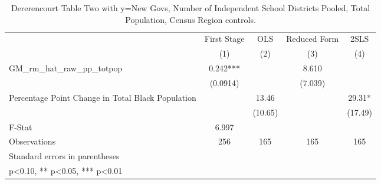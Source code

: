 \begin{table}[htbp]\centering
\def\sym#1{\ifmmode^{#1}\else\(^{#1}\)\fi}
\caption{Dererencourt Table Two with y=New Govs, Number of Independent School Districts  Pooled, Total Population, Census Region controls.}
\begin{tabular}{l*{4}{c}}
\toprule
                    & First Stage   &         OLS   &Reduced Form   &        2SLS   \\
                    &\multicolumn{1}{c}{(1)}   &\multicolumn{1}{c}{(2)}   &\multicolumn{1}{c}{(3)}   &\multicolumn{1}{c}{(4)}   \\
\midrule
GM\_rm\_hat\_raw\_pp\_totpop&       0.242***&               &       8.610   &               \\
                    &    (0.0914)   &               &     (7.039)   &               \\
\addlinespace
Percentage Point Change in Total Black Population&               &       13.46   &               &       29.31*  \\
                    &               &     (10.65)   &               &     (17.49)   \\
\midrule
F-Stat              &       6.997   &               &               &               \\
Observations        &         256   &         165   &         165   &         165   \\
\bottomrule
\multicolumn{5}{l}{\footnotesize Standard errors in parentheses}\\
\multicolumn{5}{l}{\footnotesize * p<0.10, ** p<0.05, *** p<0.01}\\
\end{tabular}
\end{table}
